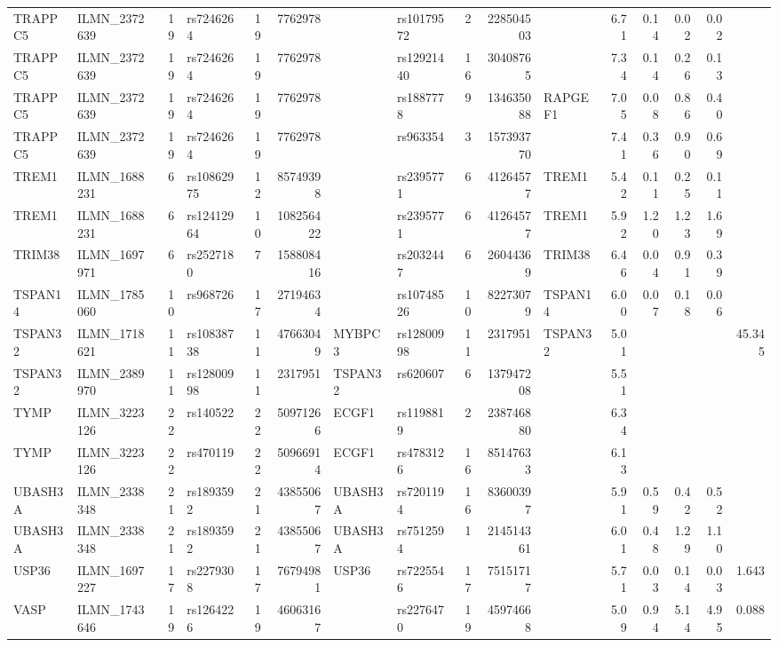 \documentclass{article}
\begin{document}
\begin{landscape}
{\begin{ThreePartTable}
\begin{longtable}{|llr|lrrl|lrrl|rrrr|r|}
TRAPPC5 & ILMN\_2372639 & 19 & rs7246264 & 19 & 7762978 &  & rs10179572 & 2 & 228504503 &  & 6.71 & 0.14 & 0.02 & 0.02 &  \\
TRAPPC5 & ILMN\_2372639 & 19 & rs7246264 & 19 & 7762978 &  & rs12921440 & 16 & 30408765 &  & 7.34 & 0.14 & 0.26 & 0.13 &  \\
TRAPPC5 & ILMN\_2372639 & 19 & rs7246264 & 19 & 7762978 &  & rs1887778 & 9 & 134635088 & RAPGEF1 & 7.05 & 0.08 & 0.86 & 0.40 &  \\
TRAPPC5 & ILMN\_2372639 & 19 & rs7246264 & 19 & 7762978 &  & rs963354 & 3 & 157393770 &  & 7.41 & 0.36 & 0.90 & 0.69 &  \\
TREM1 & ILMN\_1688231 & 6 & rs10862975 & 12 & 85749398 &  & rs2395771 & 6 & 41264577 & TREM1 & 5.42 & 0.11 & 0.25 & 0.11 &  \\
TREM1 & ILMN\_1688231 & 6 & rs12412964 & 10 & 108256422 &  & rs2395771 & 6 & 41264577 & TREM1 & 5.92 & 1.20 & 1.23 & 1.69 &  \\
TRIM38 & ILMN\_1697971 & 6 & rs2527180 & 7 & 158808416 &  & rs2032447 & 6 & 26044369 & TRIM38 & 6.46 & 0.04 & 0.91 & 0.39 &  \\
TSPAN14 & ILMN\_1785060 & 10 & rs968726 & 17 & 27194634 &  & rs10748526 & 10 & 82273079 & TSPAN14 & 6.00 & 0.07 & 0.18 & 0.06 &  \\
TSPAN32 & ILMN\_1718621 & 11 & rs10838738 & 11 & 47663049 & MYBPC3 & rs12800998 & 11 & 2317951 & TSPAN32 & 5.01 &  &  &  & 45.345 \\
TSPAN32 & ILMN\_2389970 & 11 & rs12800998 & 11 & 2317951 & TSPAN32 & rs620607 & 6 & 137947208 &  & 5.51 &  &  &  &  \\
TYMP & ILMN\_3223126 & 22 & rs140522 & 22 & 50971266 & ECGF1 & rs1198819 & 2 & 238746880 &  & 6.34 &  &  &  &  \\
TYMP & ILMN\_3223126 & 22 & rs470119 & 22 & 50966914 & ECGF1 & rs4783126 & 16 & 85147633 &  & 6.13 &  &  &  &  \\
UBASH3A & ILMN\_2338348 & 21 & rs1893592 & 21 & 43855067 & UBASH3A & rs7201194 & 16 & 83600397 &  & 5.91 & 0.59 & 0.42 & 0.52 &  \\
UBASH3A & ILMN\_2338348 & 21 & rs1893592 & 21 & 43855067 & UBASH3A & rs7512594 & 1 & 214514361 &  & 6.01 & 0.48 & 1.29 & 1.10 &  \\
USP36 & ILMN\_1697227 & 17 & rs2279308 & 17 & 76794981 & USP36 & rs7225546 & 17 & 75151717 &  & 5.71 & 0.03 & 0.14 & 0.03 & 1.643 \\
VASP & ILMN\_1743646 & 19 & rs1264226 & 19 & 46063167 &  & rs2276470 & 19 & 45974668 &  & 5.09 & 0.94 & 5.14 & 4.95 & 0.088 \\

\end{longtable}
\end{ThreePartTable}}
\end{landscape}
\end{document}
